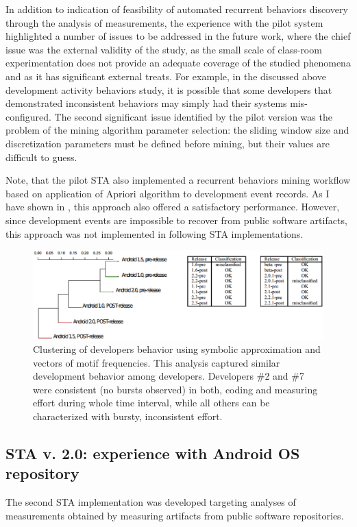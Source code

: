 In addition to indication of feasibility of automated recurrent behaviors discovery through the analysis of measurements, 
the experience with the pilot system highlighted a number of issues to be addressed in the future work, 
where the chief issue was the external validity of the study, as the small scale of class-room 
experimentation does not provide an adequate coverage of the studied phenomena and as it has significant external 
treats. For example, in the discussed above development activity behaviors study, it is possible that some developers 
that demonstrated inconsistent behaviors may simply had their systems mis-configured.
The second significant issue identified by the pilot version was the problem of the mining algorithm parameter selection:
the sliding window size and discretization parameters must be defined before mining, but their values are difficult 
to guess.

Note, that the pilot STA also implemented a recurrent behaviors mining workflow based on application of Apriori algorithm 
\cite{citeulike:775528} to development event records. As I have shown in \cite{citeulike:13159603}, this approach also
offered a satisfactory performance. However, since development events are impossible to recover from public software 
artifacts, this approach was not implemented in following STA implementations.

\begin{figure}[t]
   \centering
   \includegraphics[width=145mm]{figures/STA2-draft.eps}
   \caption{Clustering of developers behavior using symbolic approximation and vectors of motif frequencies. 
   This analysis captured similar development behavior among developers. 
   Developers \#2 and \#7 were consistent (no bursts observed) in both, coding and measuring effort during whole time interval, 
   while all others can be characterized with bursty, inconsistent effort.}
   \label{fig:STA2-results}
\end{figure}

\subsection{STA v. 2.0: experience with Android OS repository}
The second STA implementation was developed targeting analyses of measurements obtained by measuring artifacts from public 
software repositories.

